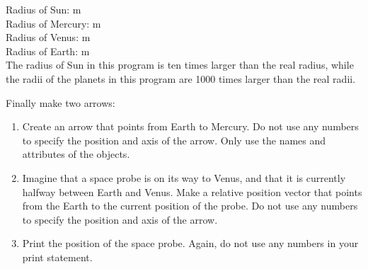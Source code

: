\begin{enumerate}
Radius of Sun:  m\\
Radius of Mercury:   m\\
Radius of Venus:  m\\
Radius of Earth:  m\\

The radius of Sun in this program is ten times larger than the real radius, while the radii of the planets in this program are 1000 times larger than the real radii.

Finally make two arrows:

\begin{enumerate}
	\item Create an arrow that points from Earth to Mercury. Do not use any numbers to specify the position and axis of the arrow. Only use the names and attributes of the objects.
	\item Imagine that a space probe is on its way to Venus, and that it is currently halfway between Earth and Venus.  Make a relative position vector that points from the Earth to the current position of the probe. Do not use any numbers to specify the position and axis of the arrow.
	\item Print the position of the space probe. Again, do not use any numbers in your print statement.
\end{enumerate}

\end{enumerate}